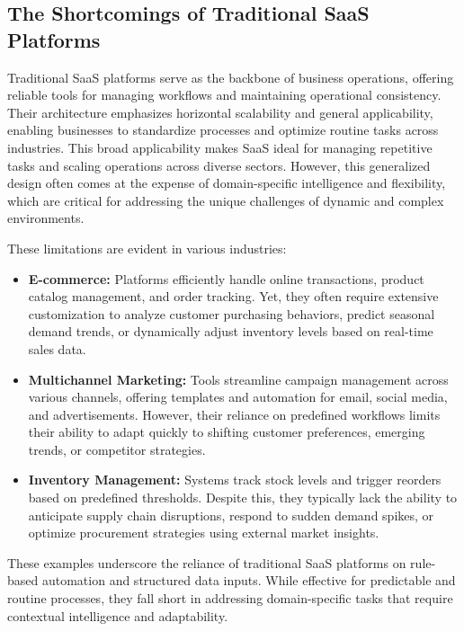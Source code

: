 \documentclass[12pt]{article}
\begin{document}
\subsection{The Shortcomings of Traditional SaaS Platforms}
Traditional SaaS platforms serve as the backbone of business operations, offering reliable tools for managing workflows and maintaining operational consistency. Their architecture emphasizes horizontal scalability and general applicability, enabling businesses to standardize processes and optimize routine tasks across industries. This broad applicability makes SaaS ideal for managing repetitive tasks and scaling operations across diverse sectors. However, this generalized design often comes at the expense of domain-specific intelligence and flexibility, which are critical for addressing the unique challenges of dynamic and complex environments.

These limitations are evident in various industries:
\begin{itemize}
    \item \textbf{E-commerce:} Platforms efficiently handle online transactions, product catalog management, and order tracking. Yet, they often require extensive customization to analyze customer purchasing behaviors, predict seasonal demand trends, or dynamically adjust inventory levels based on real-time sales data.
    \item \textbf{Multichannel Marketing:} Tools streamline campaign management across various channels, offering templates and automation for email, social media, and advertisements. However, their reliance on predefined workflows limits their ability to adapt quickly to shifting customer preferences, emerging trends, or competitor strategies.

\newpage
    \item \textbf{Inventory Management:} Systems track stock levels and trigger reorders based on predefined thresholds. Despite this, they typically lack the ability to anticipate supply chain disruptions, respond to sudden demand spikes, or optimize procurement strategies using external market insights.
\end{itemize}

These examples underscore the reliance of traditional SaaS platforms on rule-based automation and structured data inputs. While effective for predictable and routine processes, they fall short in addressing domain-specific tasks that require contextual intelligence and adaptability.
\end{document}
